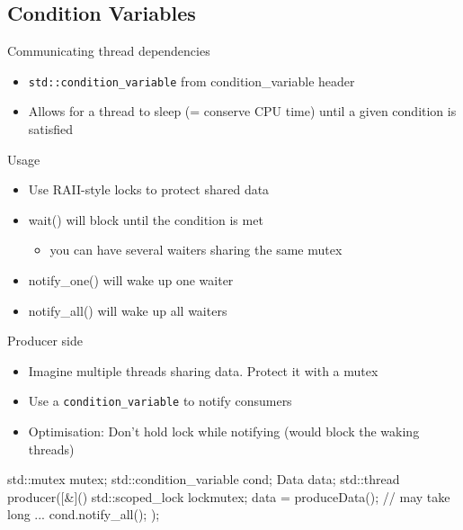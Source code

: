 \subsection[condition]{Condition Variables}

\begin{frame}[fragile]
  \begin{block}{Communicating thread dependencies}
    \begin{itemize}
      \item \texttt{std::condition\_variable} from condition\_variable header
      \item Allows for a thread to sleep (= conserve CPU time) until a given condition is satisfied
    \end{itemize}
  \end{block}
  \pause
  \begin{block}{Usage}
    \begin{itemize}
    \item Use RAII-style locks to protect shared data
    \item wait() will block until the condition is met
      \begin{itemize}
      \item you can have several waiters sharing the same mutex
      \end{itemize}
    \item notify\_one() will wake up one waiter
    \item notify\_all() will wake up all waiters
    \end{itemize}
  \end{block}
\end{frame}

\begin{frame}[fragile]
  \begin{block}{Producer side}
    \begin{itemize}
      \item Imagine multiple threads sharing data. Protect it with a mutex
      \item Use a \texttt{condition\_variable} to notify consumers
      \item Optimisation: Don't hold lock while notifying (would block the waking threads)
    \end{itemize}
  \end{block}
  \begin{exampleblock}{}
    \begin{cppcode*}{}
      std::mutex mutex;
      std::condition_variable cond;
      Data data;
      std::thread producer([&](){
        {
          std::scoped_lock lock{mutex};
          data = produceData(); // may take long ...
        }
        cond.notify_all();
      });
    \end{cppcode*}
  \end{exampleblock}
\end{frame}

